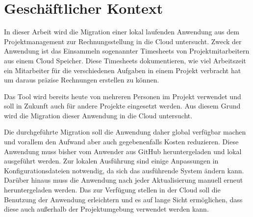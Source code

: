 \section{Geschäftlicher Kontext}

In dieser Arbeit wird die Migration einer lokal laufenden Anwendung aus dem Projektmanagement zur Rechnungsstellung in die Cloud untersucht.
Zweck der Anwendung ist das Einsammeln sogenannter Timesheets von Projektmitarbeitern aus einem Cloud Speicher. Diese Timesheets dokumentieren,
wie viel Arbeitszeit ein Mitarbeiter für die verschiedenen Aufgaben in einem Projekt verbracht hat um daraus präzise Rechnungen erstellen zu können.

Das Tool wird bereits heute von mehreren Personen im Projekt verwendet und soll in Zukunft auch für andere Projekte eingesetzt werden. Aus diesem
Grund wird die Migration dieser Anwendung in die Cloud untersucht.

Die durchgeführte Migration soll die Anwendung daher global verfügbar machen und vorallem den Aufwand aber auch gegebenenfalls Kosten reduzieren.
Diese Anwendung muss bisher vom Anwender aus GitHub heruntergeladen und lokal ausgeführt werden.
Zur lokalen Ausführung sind einige Anpassungen in Konfigurationsdateien notwendig, da sich das ausführende System ändern kann.
Darüber hinaus muss die Anwendung nach jeder Aktualisierung manuell erneut heruntergeladen werden.
Das zur Verfügung stellen in der Cloud soll die Benutzung der Anwendung erleichtern und es auf lange Sicht ermöglichen, dass diese auch außerhalb der Projektumgebung verwendet werden kann.